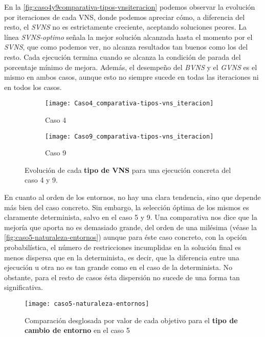 En la \autoref{fig:caso4y9comparativa-tipos-vnsiteracion} podemos observar la evolución por iteraciones de cada VNS, donde podemos apreciar cómo, a diferencia del resto, el \textit{SVNS} no es estrictamente creciente, aceptando soluciones peores. La línea \textit{SVNS-optimo} señala la mejor solución alcanzada hasta el momento por el \textit{SVNS}, que como podemos ver, no alcanza resultados tan buenos como los del resto. Cada ejecución termina cuando se alcanza la condición de parada del porcentaje mínimo de mejora. Además, el desempeño del \textit{BVNS} y el \textit{GVNS} es el mismo en ambos casos, aunque esto no siempre sucede en todas las iteraciones ni en todos los casos.

\begin{figure}[h]
	\begin{subfigure}{\linewidth}
		\centering
		\texttt{[image: Caso4\_comparativa-tipos-vns\_iteracion]}
		\caption{Caso 4}
		\label{fig:caso4comparativa-tipos-vnsiteracion}
	\end{subfigure}

	\begin{subfigure}{\linewidth}
		\centering
		\texttt{[image: Caso9\_comparativa-tipos-vns\_iteracion]}
		\caption{Caso 9}
		\label{fig:caso9comparativa-tipos-vnsiteracion}
	\end{subfigure}
	\caption{Evolución de cada \textbf{tipo de VNS} para una ejecución concreta del caso 4 y 9.}
	\label{fig:caso4y9comparativa-tipos-vnsiteracion}
\end{figure}

En cuanto al orden de los entornos, no hay una clara tendencia, sino que depende más bien del caso concreto. Sin embargo, la selección óptima de los mismos es claramente determinista, salvo en el caso 5 y 9. 
Una comparativa nos dice que la mejoría que aporta no es demasiado grande, del orden de una milésima (véase la \autoref{fig:caso5-naturaleza-entornos}) aunque para éste caso concreto, con la opción probabilística, el número de restricciones incumplidas en la solución final es menos dispersa que en la determinista, es decir, que la diferencia entre una ejecución u otra no es tan grande como en el caso de la determinista. No obstante, para el resto de casos ésta dispersión no sucede de una forma tan significativa.

\begin{figure}[h]
	\centering
	\texttt{[image: caso5-naturaleza-entornos]}
	\caption{Comparación desglosada por valor de cada objetivo para el \textbf{tipo de cambio de entorno} en el caso 5}
	\label{fig:caso5-naturaleza-entornos}
\end{figure}

